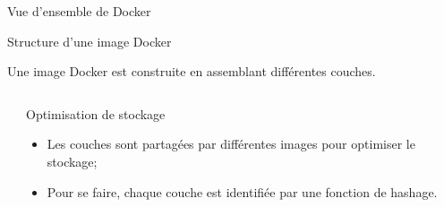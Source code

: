 \documentclass[aspectratio=169,10pt]{beamer}
\begin{document}

\begin{frame}{Vue d'ensemble de Docker}



\end{frame}


\begin{frame}{Structure d'une image Docker}

Une image Docker est construite en assemblant différentes \alert{couches}.

\begin{columns}[T,onlytextwidth]
    \begin{column}{.5\linewidth}
    \begin{center}
        
    \end{center}
    \end{column}
    \begin{column}{.5\linewidth}
    \vspace{1.5cm}
    \alert{Optimisation de stockage}
    \begin{itemize}
        \item Les couches sont partagées par différentes images pour optimiser le stockage;
        \item Pour se faire, chaque couche est identifiée par une fonction de hashage.
    \end{itemize}
    \end{column}
\end{columns}

\end{frame}

\end{document}
